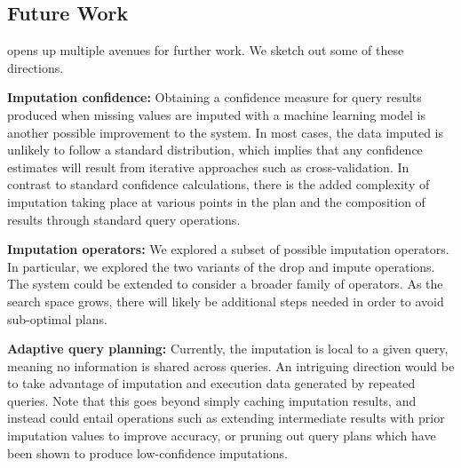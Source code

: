 \subsection{Future Work}
\ProjectName{} opens up multiple avenues for further work. We sketch out some of these
directions.

\textbf{Imputation confidence:} Obtaining a confidence measure for query results
produced when missing values are imputed with a machine learning model is
another possible improvement to the system. In most cases, the data imputed
is unlikely to follow a standard distribution, which implies that any confidence
estimates will result from iterative approaches such as cross-validation\cite{kohavi1995study}.
In contrast to standard confidence calculations, there is the added complexity
of imputation taking place at various points in the plan and the composition of results
through standard query operations.

\textbf{Imputation operators:} We explored a subset of possible imputation operators.
In particular, we explored the two variants of the drop and impute operations. The system
could be extended to consider a broader family of operators. As the search space grows,
there will likely be additional steps needed in order to avoid sub-optimal plans.

\textbf{Adaptive query planning:} Currently, the imputation is local to a given query, meaning
no information is shared across queries. An intriguing direction would be to take advantage
of imputation and execution data generated by repeated queries. Note that this goes beyond
simply caching imputation results, and instead could entail operations such as extending
intermediate results with prior imputation values to improve accuracy, or pruning out
query plans which have been shown to produce low-confidence imputations.

